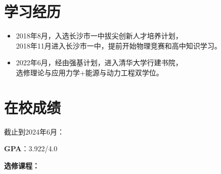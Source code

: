 \documentclass{resume}
\begin{document}




\sepspace
{}


\section{学习经历}
\begin{itemize}
  \item 2018年8月，入选长沙市一中拔尖创新人才培养计划，\\2018年11月进入长沙市一中，提前开始物理竞赛和高中知识学习。
  \item 2022年6月，经由强基计划，进入清华大学行建书院，\\选修理论与应用力学+能源与动力工程双学位。
\end{itemize}

\section{在校成绩}
截止到2024年6月：

\qquad \qquad \textbf{GPA}：3.922/4.0 

\sepspace

\textbf{选修课程：}
  
\end{document}

